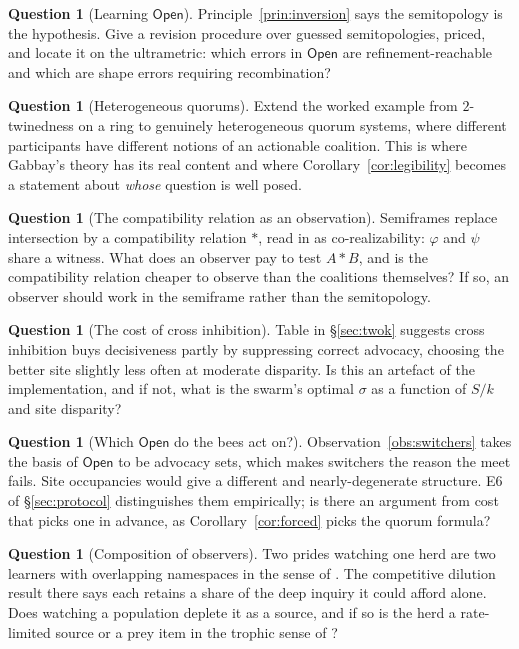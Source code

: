 \documentclass[11pt,a4paper]{article}
\theoremstyle{plain}
\theoremstyle{definition}
\newtheorem{question}[theorem]{Question}
\theoremstyle{remark}
\newcommand{\Open}{\mathsf{Open}}
\begin{document}
\begin{question}[Learning $\Open$]
Principle~\ref{prin:inversion} says the semitopology is the hypothesis. Give a
revision procedure over guessed semitopologies, priced, and locate it on the
ultrametric: which errors in $\Open$ are refinement-reachable and which are
shape errors requiring recombination?
\end{question}

\begin{question}[Heterogeneous quorums]
Extend the worked example from $2$-twinedness on a ring to genuinely
heterogeneous quorum systems, where different participants have different
notions of an actionable coalition. This is where Gabbay's theory has its real
content and where Corollary~\ref{cor:legibility} becomes a statement about
\emph{whose} question is well posed.
\end{question}

\begin{question}[The compatibility relation as an observation]
Semiframes replace intersection by a compatibility relation $*$, read in
\cite{realizability} as co-realizability: $\varphi$ and $\psi$ share a witness.
What does an observer pay to test $A * B$, and is the compatibility relation
cheaper to observe than the coalitions themselves? If so, an observer should
work in the semiframe rather than the semitopology.
\end{question}

\begin{question}[The cost of cross inhibition]
Table in \S\ref{sec:twok} suggests cross inhibition buys decisiveness partly by
suppressing correct advocacy, choosing the better site slightly less often at
moderate disparity. Is this an artefact of the implementation, and if not, what
is the swarm's optimal $\sigma$ as a function of $S/k$ and site disparity?
\end{question}

\begin{question}[Which $\Open$ do the bees act on?]
Observation~\ref{obs:switchers} takes the basis of $\Open$ to be advocacy sets,
which makes switchers the reason the meet fails. Site occupancies would give a
different and nearly-degenerate structure. E6 of \S\ref{sec:protocol}
distinguishes them empirically; is there an argument from cost that picks one
in advance, as Corollary~\ref{cor:forced} picks the quorum formula?
\end{question}

\begin{question}[Composition of observers]
Two prides watching one herd are two learners with overlapping namespaces in
the sense of \cite{compose}. The competitive dilution result there says each
retains a share of the deep inquiry it could afford alone. Does watching a
population deplete it as a source, and if so is the herd a rate-limited source
or a prey item in the trophic sense of \cite[\S10]{scientist}?
\end{question}
\end{document}

